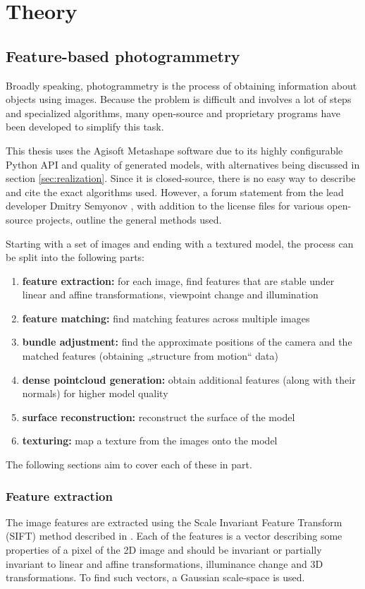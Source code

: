 \chapter{Theory}\label{sec:theory}

\section{Feature-based photogrammetry}
Broadly speaking, photogrammetry is the process of obtaining information about objects using images.
Because the problem is difficult and involves a lot of steps and specialized algorithms, many open-source and proprietary programs have been developed to simplify this task.

This thesis uses the Agisoft Metashape software due to its highly configurable Python API and quality of generated models, with alternatives being discussed in section \ref{sec:realization}.
Since it is closed-source, there is no easy way to describe and cite the exact algorithms used.
However, a forum statement from the lead developer Dmitry Semyonov \parencite{metashapeForumPost}, with addition to the license files for various open-source projects, outline the general methods used.

Starting with a set of images and ending with a textured model, the process can be split into the following parts:

\begin{enumerate}
	\item \textbf{feature extraction:} for each image, find features that are stable under linear and affine transformations, viewpoint change and illumination
	\item \textbf{feature matching:} find matching features across multiple images
	\item \textbf{bundle adjustment:} find the approximate positions of the camera and the matched features (obtaining „structure from motion“ data)
	\item \textbf{dense pointcloud generation:} obtain additional features (along with their normals) for higher model quality
	\item \textbf{surface reconstruction:} reconstruct the surface of the model
	\item \textbf{texturing:} map a texture from the images onto the model
\end{enumerate}

The following sections aim to cover each of these in part.

\subsection{Feature extraction} \label{ch:fext}
The image features are extracted using the Scale Invariant Feature Transform (SIFT) method described in \citet{lowe1999object,lowe2004distinctive}.
Each of the features is a vector describing some properties of a pixel of the 2D image and should be invariant or partially invariant to linear and affine transformations, illuminance change and 3D transformations.
To find such vectors, a Gaussian scale-space is used.


